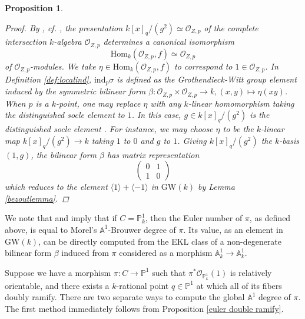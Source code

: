 \documentclass[12pt, reqno]{amsart}
\newtheorem{proposition}[theorem]{Proposition}
\theoremstyle{definition}
\newcommand{\A}{\mathbb{A}} %
\newcommand{\Proj}{\mathbb{P}} %
\newcommand{\GW}{\mathrm{GW}} %
\newcommand{\Oh}{\mathscr{O}} %
\newcommand{\ind}{\mathrm{ind}} %
\newcommand{\Hom}{\text{Hom}}
\begin{document}
\begin{proposition}
\begin{proof}
By \cite[Section 3]{SS75}, cf. \cite[Section 4, the discussion after Lemma 27]{kwcubic}, the presentation $k[x]_q/(g^2) \simeq \mathscr{O}_{Z,p}$ of the complete intersection $k$-algebra $\mathscr{O}_{Z,p}$ determines a canonical isomorphism
$$\Hom_k(\mathscr{O}_{Z,p},f) \simeq \mathscr{O}_{Z,p}$$
of $\mathscr{O}_{Z,p}$-modules. We take $\eta \in \Hom_k(\mathscr{O}_{Z,p},f)$ to correspond to $1 \in \mathscr{O}_{Z,p}$. In Definition \ref{def:localind}, $\ind_p \sigma$ is defined as the Grothendieck-Witt group element induced by the symmetric bilinear form $\beta: \mathscr{O}_{Z,p} \times \mathscr{O}_{Z,p} \rightarrow k, (x,y) \mapsto \eta(xy)$. When $p$ is a $k$-point, one may replace $\eta$ with any $k$-linear homomorphism taking the distinguished socle element to $1$. In this case, $g \in k[x]_q/(g^2)$ is the distinguished socle element \cite[Example 32]{kwcubic}. For instance, we may choose $\eta$ to be the $k$-linear map $k[x]_q/(g^2) \rightarrow k$ taking $1$ to $0$ and $g$ to $1$. Giving $k[x]_q/(g^2)$ the $k$-basis $(1,g)$, the bilinear form $\beta$ has matrix representation
$$\begin{pmatrix} 0 & 1 \\ 1 & 0 \end{pmatrix}$$
which reduces to the element $\langle 1 \rangle + \langle -1 \rangle$ in $\GW(k)$ by Lemma \ref{bezoutlemma}.
\end{proof}
\end{proposition}

We note that \cite[Example 32]{kwcubic} and \cite[Main Theorem, Proposition 14]{kwEKL} imply that if $C = \Proj^1_k$, then the Euler number of $\pi$, as defined above, is equal to Morel's $\A^1$-Brouwer degree of $\pi$. Its value, as an element in $\GW(k)$, can be directly computed from the EKL class of a non-degenerate bilinear form $\beta$ induced from $\pi$ considered as a morphism $\A^1_k \to \A^1_k$.

Suppose we have a morphism $\pi: C \to \mathbb{P}^1$ such that $\pi^* \Oh_{\mathbb{P}^1_k}(1)$ is relatively orientable, and there exists a $k$-rational point $q \in \mathbb{P}^1$ at which all of its fibers doubly ramify. There are two separate ways to compute the global $\A^1$ degree of $\pi$. The first method immediately follows from Proposition \ref{euler double ramify}. 
\end{document}
